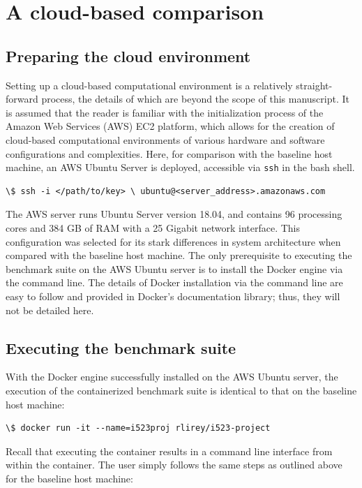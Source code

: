 \documentclass[sigconf]{acmart}
\begin{document}
\section{A cloud-based comparison}

\subsection{Preparing the cloud environment}

Setting up a cloud-based computational environment is a relatively straight-forward process, the details of which are beyond the scope of this manuscript. It is assumed that the reader is familiar with the initialization process of the Amazon Web Services (AWS) EC2 platform, which allows for the creation of cloud-based computational environments of various hardware and software configurations and complexities. Here, for comparison with the baseline host machine, an AWS Ubuntu Server is deployed, accessible via {\tt ssh} in the bash shell. 

\begin{lstlisting}
\$ ssh -i </path/to/key> \ ubuntu@<server_address>.amazonaws.com
\end{lstlisting}

The AWS server runs Ubuntu Server version 18.04, and contains 96 processing cores and 384 GB of RAM with a 25 Gigabit network interface. This configuration was selected for its stark differences in system architecture when compared with the baseline host machine. The only prerequisite to executing the benchmark suite on the AWS Ubuntu server is to install the Docker engine via the command line. The details of Docker installation via the command line are easy to follow and provided in Docker's documentation library; thus, they will not be detailed here.

\subsection{Executing the benchmark suite}

With the Docker engine successfully installed on the AWS Ubuntu server, the execution of the containerized benchmark suite is identical to that on the baseline host machine:

\begin{lstlisting}
\$ docker run -it --name=i523proj rlirey/i523-project
\end{lstlisting}

Recall that executing the container results in a command line interface from within the container. The user simply follows the same steps as outlined above for the baseline host machine:
\end{document}
